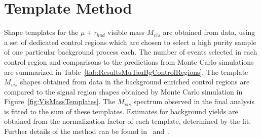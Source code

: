 \section{Template Method}
\label{sec:template}
%
Shape templates for the $\mu + \tau_{had}$ visible mass $M_{vis}$ are obtained
from data, using a set of dedicated control regions which are chosen to select a
high purity sample of one particular background process each.  The number of
events selected in each control region and comparisons to the predictions from
Monte Carlo simulations are summarized in
Table~\ref{tab:ResultsMuTauBgControlRegions}.  The template $M_{vis}$ shapes
obtained from data in the background enriched control regions are compared to
the signal region shapes obtained by Monte Carlo simulation in
Figure~\ref{fig:VisMassTemplates}.  The $M_{vis}$ spectrum observed in the final
analysis is fitted to the sum of these templates.  Estimates for background
yields are obtained from the normalization factor of each template, determined
by the fit.  Further details of the method can be found
in~\cite{CMS_AN_2010-088} and~\cite{CMS_AN_2011-021}. 
%
